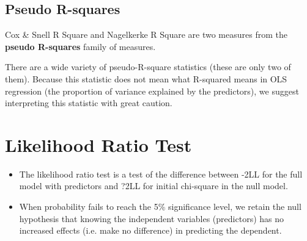 \documentclass[a4paper,12pt]{article}
\begin{document}
\subsection{Pseudo R-squares}
Cox \& Snell R Square and Nagelkerke R Square are two measures from the \textbf{pseudo R-squares} family of measures.


There are a wide variety of pseudo-R-square statistics (these are only two of them).  Because this statistic does not mean what R-squared means in OLS regression (the proportion of variance explained by the predictors), we suggest interpreting this statistic with great caution.


\section{Likelihood Ratio Test}
\begin{itemize}
	\item The likelihood ratio test is a test of the difference between -2LL for the full
	model with predictors and ?2LL for initial chi-square in the null model.
	\item When probability fails to reach the 5\% significance level, we retain the null hypothesis
	that knowing the independent variables (predictors) has no increased effects (i.e. make no
	difference) in predicting the dependent.
\end{itemize}
\end{document}
